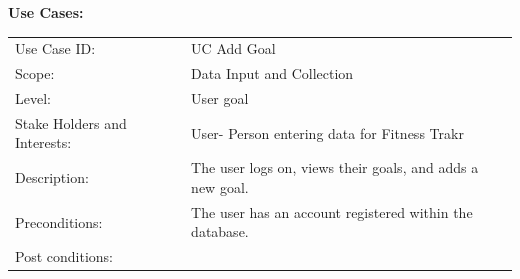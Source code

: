\documentclass[10pt]{article}
\begin{document}
\textbf{Use Cases:}
\begin{longtable}[]{@{}ll@{}}
\toprule
\begin{minipage}[t]{0.47\columnwidth}\raggedright\strut
Use Case ID:\strut
\end{minipage} & \begin{minipage}[t]{0.47\columnwidth}\raggedright\strut
UC Add Goal\strut
\end{minipage}\tabularnewline
\begin{minipage}[t]{0.47\columnwidth}\raggedright\strut
Scope:\strut
\end{minipage} & \begin{minipage}[t]{0.47\columnwidth}\raggedright\strut
Data Input and Collection\strut
\end{minipage}\tabularnewline
\begin{minipage}[t]{0.47\columnwidth}\raggedright\strut
Level:\strut
\end{minipage} & \begin{minipage}[t]{0.47\columnwidth}\raggedright\strut
User goal\strut
\end{minipage}\tabularnewline
\begin{minipage}[t]{0.47\columnwidth}\raggedright\strut
Stake Holders and Interests:\strut
\end{minipage} & \begin{minipage}[t]{0.47\columnwidth}\raggedright\strut
User- Person entering data for Fitness Trakr\strut
\end{minipage}\tabularnewline
\begin{minipage}[t]{0.47\columnwidth}\raggedright\strut
Description:\strut
\end{minipage} & \begin{minipage}[t]{0.47\columnwidth}\raggedright\strut
The user logs on, views their goals, and adds a new goal.\strut
\end{minipage}\tabularnewline
\begin{minipage}[t]{0.47\columnwidth}\raggedright\strut
Preconditions:\strut
\end{minipage} & \begin{minipage}[t]{0.47\columnwidth}\raggedright\strut
The user has an account registered within the database.\strut
\end{minipage}\tabularnewline
\begin{minipage}[t]{0.47\columnwidth}\raggedright\strut
Post conditions:\strut
\end{minipage} & \begin{minipage}[t]{0.47\columnwidth}\raggedright\strut

\end{minipage}
\end{longtable}
\end{document}
